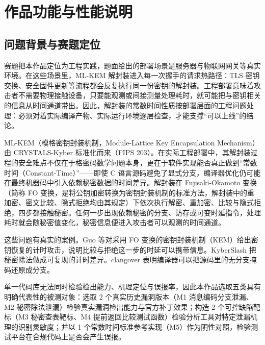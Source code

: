 
\section{作品功能与性能说明}

\subsection{问题背景与赛题定位}

赛题把本作品定位为工程实践，题面给出的部署场景是服务器与物联网网关等真实环境。在这些场景里，ML-KEM 解封装进入每一次握手的请求热路径：TLS 密钥交换、安全固件更新等流程都会反复执行同一份密钥的解封装。工程部署意味着攻击者不需要物理接触设备，只要能观测或间接测量处理耗时，就可能把与密钥相关的信息从时间通道带出。因此，解封装的常数时间性质按部署层面的工程问题处理：必须对着实际编译产物、实际运行环境逐层检查，才能支撑“可以上线”的结论。

ML-KEM（模格密钥封装机制，Module-Lattice Key Encapsulation Mechanism）由 CRYSTALS-Kyber 标准化而来（FIPS 203\cite{fips203,kyber2018}）。在实际工程部署中，其解封装过程的安全难点不仅在于格密码数学问题本身，更在于软件实现能否真正做到“常数时间（Constant-Time）”——即使 C 语言源码避免了显式分支，编译器优化仍可能在最终机器码中引入依赖秘密数据的时间差异。解封装在 Fujisaki-Okamoto 变换（简称 FO 变换，是将公钥加密转换为密钥封装机制的标准方法，解封装中的重加密、密文比较、隐式拒绝均由其规定）下依次执行解密、重加密、比较与隐式拒绝，四步都接触秘密。任何一步出现依赖秘密的分支、访存或可变时延指令，处理耗时就会随秘密值变化，秘密信息便进入攻击者可以观测的时间通道。

这些问题有真实的案例。Guo 等对采用 FO 变换的密钥封装机制（KEM）给出密钥恢复的计时攻击，说明比较与拒绝这一步的时延可以携带信息\cite{guo2020}。KyberSlash 把秘密除法做成可复现的计时差异\cite{kyberslash}。clangover 表明编译器可以把源码里的无分支掩码还原成分支\cite{clangover}。

单一代码库无法同时检验检出能力、机理定位与误报率，因此本作品选取五类具有明确代表性的被测对象：选取 2 个真实历史漏洞版本（M1 消息编码分支泄漏、M2 秘密除法泄漏）检验真实漏洞检出能力与官方补丁效果；构造 2 个可控缺陷靶标（M3 秘密查表靶标、M4 提前返回比较测试函数）检验分析工具对特定泄漏机理的识别灵敏度；并以 1 个常数时间标准参考实现（M5）作为阴性对照，检验测试平台在合规代码上是否会产生误报。

